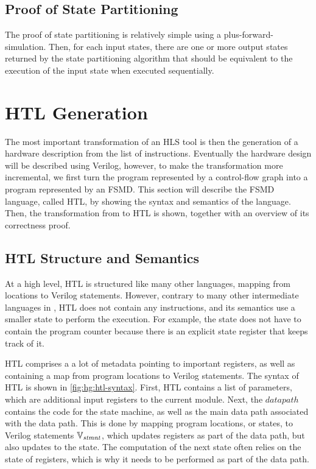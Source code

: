\subsection{Proof of State Partitioning}

The proof of state partitioning is relatively simple using a
\gls{plus-forward-simulation}.  Then, for each input states, there are one or
more output states returned by the state partitioning algorithm that should be
equivalent to the execution of the input state when executed sequentially.

\section{HTL Generation}%
\label{sec:hg:htl-generation}

The most important transformation of an HLS tool is then the generation of a
hardware description from the list of instructions.  Eventually the hardware
design will be described using Verilog, however, to make the transformation more
incremental, we first turn the program represented by a control-flow graph into
a program represented by an \gls{FSMD}.  This section will describe the
\gls{FSMD} language, called HTL, by showing the syntax and semantics of the
language.  Then, the transformation from \rtlsubpar{} to HTL is shown, together
with an overview of its correctness proof.

\subsection{HTL Structure and Semantics}%
\label{sec:hg:htl-structure-and-semantics}

At a high level, HTL is structured like many other \compcert{} languages,
mapping from locations to Verilog statements.  However, contrary to many other
intermediate languages in \compcert{}, HTL does not contain any instructions,
and its semantics use a smaller state to perform the execution.  For example,
the state does not have to contain the program counter because there is an
explicit state register that keeps track of it.

HTL comprises a a lot of metadata pointing to important registers, as well as
containing a map from program locations to Verilog statements.  The syntax of
HTL is shown in \cref{fig:hg:htl-syntax}.  First, HTL contains a list of
parameters, which are additional input registers to the current module.  Next,
the $\mathit{datapath}$ contains the code for the state machine, as well as the
main data path associated with the data path.  This is done by mapping program
locations, or states, to Verilog statements $\mathbb{V}_\mathit{stmnt}$, which updates
registers as part of the data path, but also updates to the state.  The
computation of the next state often relies on the state of registers, which is
why it needs to be performed as part of the data path.

